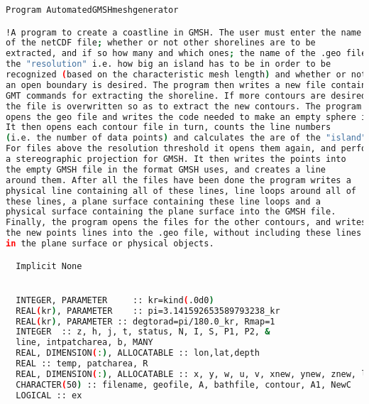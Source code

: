 \begin{lstlisting}[language = Bash]
Program AutomatedGMSHmeshgenerator

!A program to create a coastline in GMSH. The user must enter the name
of the netCDF file; whether or not other shorelines are to be 
extracted, and if so how many and which ones; the name of the .geo file;
the "resolution" i.e. how big an island has to be in order to be 
recognized (based on the characteristic mesh length) and whether or not 
an open boundary is desired. The program then writes a new file containing
GMT commands for extracting the shoreline. If more contours are desired
the file is overwritten so as to extract the new contours. The program next
opens the geo file and writes the code needed to make an empty sphere in GMSH. 
It then opens each contour file in turn, counts the line numbers 
(i.e. the number of data points) and calculates the are of the "island".
For files above the resolution threshold it opens them again, and performs 
a stereographic projection for GMSH. It then writes the points into 
the empty GMSH file in the format GMSH uses, and creates a line 
around them. After all the files have been done the program writes a 
physical line containing all of these lines, line loops around all of 
these lines, a plane surface containing these line loops and a 
physical surface containing the plane surface into the GMSH file. 
Finally, the program opens the files for the other contours, and writes 
the new points lines into the .geo file, without including these lines 
in the plane surface or physical objects.

  Implicit None


  INTEGER, PARAMETER     :: kr=kind(.0d0)
  REAL(kr), PARAMETER    :: pi=3.141592653589793238_kr
  REAL(kr), PARAMETER :: degtorad=pi/180.0_kr, Rmap=1
  INTEGER  :: z, h, j, t, status, N, I, S, P1, P2, &
  line, intpatcharea, b, MANY
  REAL, DIMENSION(:), ALLOCATABLE :: lon,lat,depth
  REAL :: temp, patcharea, R
  REAL, DIMENSION(:), ALLOCATABLE :: x, y, w, u, v, xnew, ynew, znew, latnew, lonnew
  CHARACTER(50) :: filename, geofile, A, bathfile, contour, A1, NewC
  LOGICAL :: ex


\end{lstlisting}
